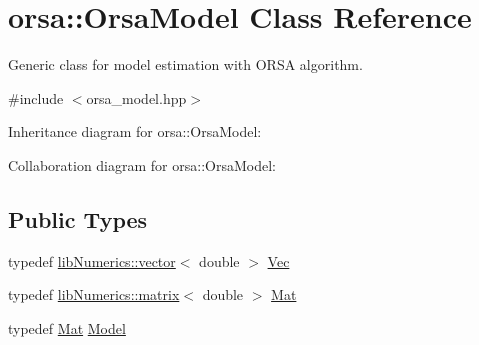 \hypertarget{classorsa_1_1OrsaModel}{}\section{orsa\+:\+:Orsa\+Model Class Reference}
\label{classorsa_1_1OrsaModel}


Generic class for model estimation with O\+R\+S\+A algorithm.  




{\ttfamily \#include $<$orsa\+\_\+model.\+hpp$>$}



Inheritance diagram for orsa\+:\+:Orsa\+Model\+:


Collaboration diagram for orsa\+:\+:Orsa\+Model\+:
\subsection*{Public Types}
\begin{DoxyCompactItemize}
\item 
typedef \hyperlink{classlibNumerics_1_1vector}{lib\+Numerics\+::vector}$<$ double $>$ \hyperlink{classorsa_1_1OrsaModel_a3e690ba72d88880cc9d7074350c09104}{Vec}
\item 
typedef \hyperlink{classlibNumerics_1_1matrix}{lib\+Numerics\+::matrix}$<$ double $>$ \hyperlink{classorsa_1_1OrsaModel_a522135c09871e55e3757780cc1ce57f5}{Mat}
\item 
typedef \hyperlink{classorsa_1_1OrsaModel_a522135c09871e55e3757780cc1ce57f5}{Mat} \hyperlink{classorsa_1_1OrsaModel_aadc7e7fc0708ca6bc623e75cdc66b5e8}{Model}
\end{DoxyCompactItemize}
